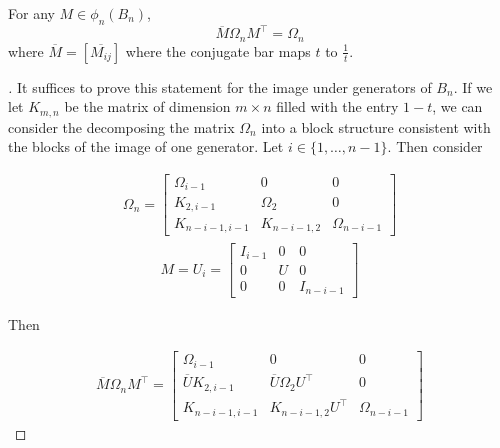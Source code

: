 \begin{theorem}
	For any $M\in \phi_n(B_n)$, 
$$\overline{M}\Omega_nM^\intercal = \Omega_n$$
where $\overline{M}=[\overline{M_{ij}}]$ where the conjugate bar maps $t$ to $\frac{1}{t}$.
\end{theorem}

\noindent\begin{proof}[\cite{Kassel}] It suffices to prove this statement for the image under generators of $B_n$. If we let $K_{m,n}$ be the matrix of dimension $m\times n$ filled with the entry $1-t$, we can consider the decomposing the matrix $\Omega_n$ into a block structure consistent with the blocks of the image of one generator. Let $i\in\{1,\hdots,n-1\}$. Then consider 

\begin{equation}
	\begin{aligned}
		\Omega_n = \begin{bmatrix}
							\Omega_{i-1} & 0 & 0\\
							K_{2,i-1} & \Omega_2 & 0 \\
							K_{n-i-1,i-1}& K_{n-i-1,2}&\Omega_{n-i-1}
						\end{bmatrix}
	\end{aligned}
\end{equation}
\begin{equation}
	\begin{aligned}
		M = U_i = \begin{bmatrix}
							I_{i-1} & 0 & 0\\
							0 & U & 0 \\
							0& 0&I_{n-i-1}
						\end{bmatrix}
	\end{aligned}
\end{equation}

Then

\begin{equation}
	\begin{aligned}
		\overline{M}\Omega_nM^\intercal = \begin{bmatrix}
														\Omega_{i-1} & 0 & 0\\
														\overline{U}K_{2,i-1} & \overline{U}\Omega_2U^\intercal & 0 \\
														K_{n-i-1,i-1}& K_{n-i-1,2}U^\intercal&\Omega_{n-i-1}
													\end{bmatrix}
	\end{aligned}
\end{equation}


\end{proof}
